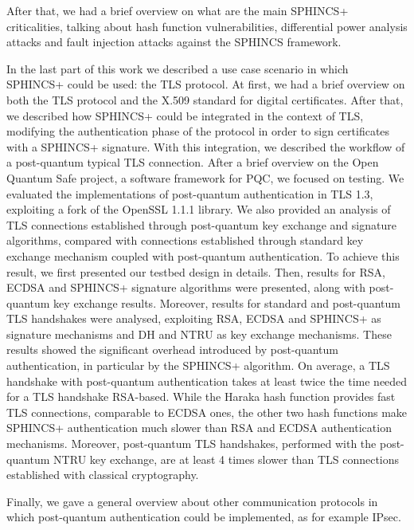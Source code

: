 \documentclass[a4paper,12pt]{article}
\begin{document}
After that, we had a brief overview on what are the main SPHINCS+ criticalities, talking about hash function vulnerabilities, differential power analysis attacks and fault injection attacks against the SPHINCS framework.

In the last part of this work we described a use case scenario in which SPHINCS+ could be used: the TLS protocol. 
At first, we had a brief overview on both the TLS protocol and the X.509 standard for digital certificates. After that, we described how SPHINCS+ could be integrated in the context of TLS, modifying the authentication phase of the protocol in order to sign certificates with a SPHINCS+ signature. With this integration, we described the workflow of a post-quantum typical TLS connection. 
After a brief overview on the Open Quantum Safe project, a software framework for PQC, we focused on testing.
We evaluated the implementations of post-quantum authentication in TLS 1.3, exploiting a fork of the OpenSSL 1.1.1 library. 
We also provided an analysis of TLS connections established through post-quantum key exchange and signature algorithms, compared with connections established through standard key exchange mechanism coupled with post-quantum authentication.
To achieve this result, we first presented our testbed design in details. Then, results for RSA, ECDSA and SPHINCS+ signature algorithms were presented, along with post-quantum key exchange results.
Moreover, results for standard and post-quantum TLS handshakes were analysed, exploiting RSA, ECDSA and SPHINCS+ as signature mechanisms and DH and NTRU as key exchange mechanisms.
These results showed the significant overhead introduced by post-quantum authentication, in particular by the SPHINCS+ algorithm. On average, a TLS handshake with post-quantum authentication takes at least twice the time needed for a TLS handshake RSA-based. While the Haraka hash function provides fast TLS connections, comparable to ECDSA ones, the other two hash functions make SPHINCS+ authentication much slower than RSA and ECDSA authentication mechanisms. Moreover, post-quantum TLS handshakes, performed with the post-quantum NTRU key exchange, are at least 4 times slower than TLS connections established with classical cryptography.

Finally, we gave a general overview about other communication protocols in which post-quantum authentication could be implemented, as for example IPsec.

\end{document}

